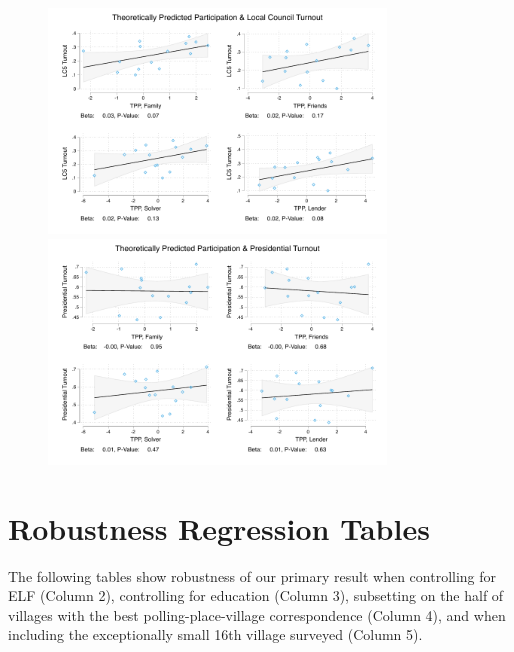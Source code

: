 \documentclass[12pt]{article}
\begin{document}
\begin{appendix}
\begin{figure}[h!]
	\begin{center}
	    \caption{}\label{figure_context_friends_family_separately}
    		\includegraphics[width=0.8\textwidth]{../3_results/context_voting_scatter_bytype_LC5.pdf}
            \includegraphics[width=0.8\textwidth]{../3_results/context_voting_scatter_bytype_presidential.pdf}
    \end{center}
\end{figure}
\pagebreak


\section{Robustness Regression Tables}\label{appendix_robustness}
The following tables show robustness of our primary result when controlling for ELF (Column 2), controlling for education (Column 3), subsetting on the half of villages with the best polling-place-village correspondence (Column 4), and when including the exceptionally small 16th village surveyed (Column 5).


\pagebreak


\end{appendix}
\end{document}
